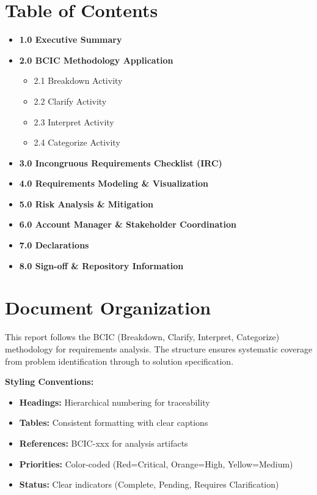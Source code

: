 \documentclass[12pt,a4paper]{article}
\begin{document}
\section*{Table of Contents}
\vspace{0.5cm}
\begin{itemize}[leftmargin=*,nosep]
\item \textbf{1.0 Executive Summary} 
\item \textbf{2.0 BCIC Methodology Application} 
  \begin{itemize}[leftmargin=*]
  \item 2.1 Breakdown Activity 
  \item 2.2 Clarify Activity 
  \item 2.3 Interpret Activity 
  \item 2.4 Categorize Activity 
  \end{itemize}
\item \textbf{3.0 Incongruous Requirements Checklist (IRC)} 
\item \textbf{4.0 Requirements Modeling \& Visualization} 
\item \textbf{5.0 Risk Analysis \& Mitigation} 
\item \textbf{6.0 Account Manager \& Stakeholder Coordination} 
\item \textbf{7.0 Declarations} 
\item \textbf{8.0 Sign-off \& Repository Information} 
\end{itemize}

\newpage

\section*{Document Organization}
This report follows the BCIC (Breakdown, Clarify, Interpret, Categorize) methodology for requirements analysis. The structure ensures systematic coverage from problem identification through to solution specification.

\textbf{Styling Conventions:}
\begin{itemize}
\item \textbf{Headings:} Hierarchical numbering for traceability
\item \textbf{Tables:} Consistent formatting with clear captions
\item \textbf{References:} BCIC-xxx for analysis artifacts
\item \textbf{Priorities:} Color-coded (Red=Critical, Orange=High, Yellow=Medium)
\item \textbf{Status:} Clear indicators (Complete, Pending, Requires Clarification)
\end{itemize}
\end{document}
